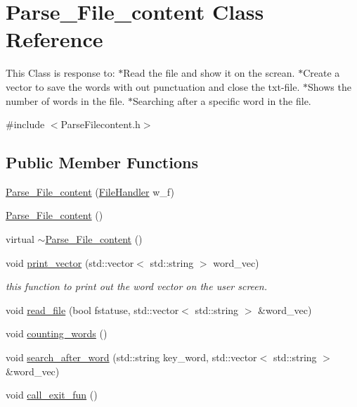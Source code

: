 \hypertarget{class_parse___file__content}{}\section{Parse\+\_\+\+File\+\_\+content Class Reference}
\label{class_parse___file__content}


This Class is response to\+: $\ast$\+Read the file and show it on the screan. $\ast$\+Create a vector to save the words with out punctuation and close the txt-\/file. $\ast$\+Shows the number of words in the file. $\ast$\+Searching after a specific word in the file.  




{\ttfamily \#include $<$Parse\+Filecontent.\+h$>$}

\subsection*{Public Member Functions}
\begin{DoxyCompactItemize}
\item 
\mbox{\hyperlink{class_parse___file__content_a1f24218f4f9a445f020381139bb7dc9f}{Parse\+\_\+\+File\+\_\+content}} (\mbox{\hyperlink{class_file_handler}{File\+Handler}} w\+\_\+f)
\item 
\mbox{\hyperlink{class_parse___file__content_a559ef5526225c22747225d5805ebcd86}{Parse\+\_\+\+File\+\_\+content}} ()
\item 
virtual \mbox{\hyperlink{class_parse___file__content_af3c8fc07e2f9a0fdafb596adbc1e167a}{$\sim$\+Parse\+\_\+\+File\+\_\+content}} ()
\item 
void \mbox{\hyperlink{class_parse___file__content_afdee39f521e6d6350f8f3d691850030e}{print\+\_\+vector}} (std\+::vector$<$ std\+::string $>$ word\+\_\+vec)
\begin{DoxyCompactList}\small\item\em this function to print out the word vector on the user screen. \end{DoxyCompactList}\item 
void \mbox{\hyperlink{class_parse___file__content_ab268b997f33a90a9ce0881a8571b44d2}{read\+\_\+file}} (bool fstatuse, std\+::vector$<$ std\+::string $>$ \&word\+\_\+vec)
\item 
void \mbox{\hyperlink{class_parse___file__content_ae3ba604aada833588554be25c5c9a607}{counting\+\_\+words}} ()
\item 
void \mbox{\hyperlink{class_parse___file__content_a945f2d6a47cc98bd34bb1f8290a8cb7c}{search\+\_\+after\+\_\+word}} (std\+::string key\+\_\+word, std\+::vector$<$ std\+::string $>$ \&word\+\_\+vec)
\item 
void \mbox{\hyperlink{class_parse___file__content_a87e06838393e70610ae87439c22031ff}{call\+\_\+exit\+\_\+fun}} ()
\end{DoxyCompactItemize}
